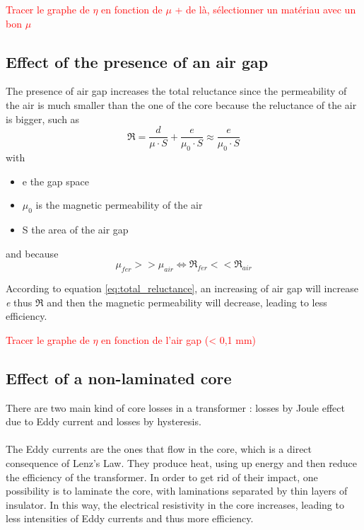 \documentclass[12pt,a4paper]{report}
\begin{document}
\textcolor{red}{Tracer le graphe de $\eta$ en fonction de $\mu$ + de là, sélectionner un matériau avec un bon $\mu$}

\subsection{Effect of the presence of an air gap}
The presence of air gap increases the total reluctance since the permeability of the air is much smaller than the one of the core because the reluctance of the air is bigger, such as
\begin{equation}
    \Re = \frac{d}{\mu \cdot S} + \frac{e}{\mu_0 \cdot S} \approx \frac{e}{\mu_0 \cdot S}
    \label{eq:total_reluctance}
\end{equation}
with
\begin{itemize}
    \item e the gap space
    \item $\mu_0$ is the magnetic permeability of the air
    \item S the area of the air gap
\end{itemize}

and because 
\begin{equation}
    \mu_{fer} >> \mu_{air} \iff {\Re_{fer}} << {\Re_{air}}
\end{equation}

According to equation \ref{eq:total_reluctance}, an increasing of air gap will increase \textit{e} thus $\Re$ and then the magnetic permeability will decrease, leading to less efficiency.

\textcolor{red}{Tracer le graphe de $\eta$ en fonction de l'air gap (< 0,1 mm)}

\subsection{Effect of a non-laminated core}
There are two main kind of core losses in a transformer : losses by Joule effect due to Eddy current and losses by hysteresis.\\ \\
The Eddy currents are the ones that flow in the core, which is a direct consequence of Lenz's Law. They produce heat, using up energy and then reduce the efficiency of the transformer. In order to get rid of their impact, one possibility is to laminate the core, with laminations separated by thin layers of insulator. In this way, the electrical resistivity in the core increases, leading to less intensities of Eddy currents and thus more efficiency.\\
\end{document}

